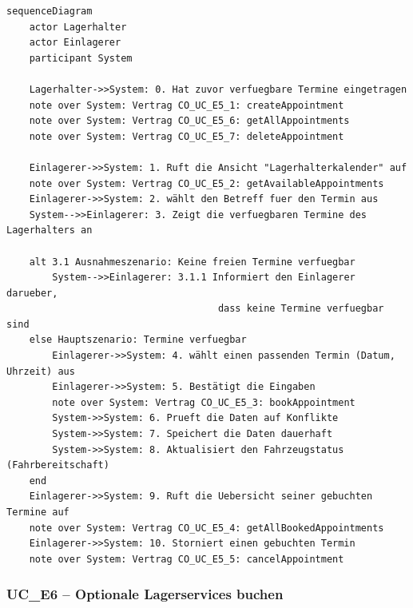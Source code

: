\begin{lstlisting}[basicstyle=\ttfamily\small, breaklines=true]
sequenceDiagram
    actor Lagerhalter
    actor Einlagerer
    participant System

    Lagerhalter->>System: 0. Hat zuvor verfuegbare Termine eingetragen
    note over System: Vertrag CO_UC_E5_1: createAppointment
    note over System: Vertrag CO_UC_E5_6: getAllAppointments
    note over System: Vertrag CO_UC_E5_7: deleteAppointment

    Einlagerer->>System: 1. Ruft die Ansicht "Lagerhalterkalender" auf
    note over System: Vertrag CO_UC_E5_2: getAvailableAppointments
    Einlagerer->>System: 2. wählt den Betreff fuer den Termin aus
    System-->>Einlagerer: 3. Zeigt die verfuegbaren Termine des Lagerhalters an

    alt 3.1 Ausnahmeszenario: Keine freien Termine verfuegbar
        System-->>Einlagerer: 3.1.1 Informiert den Einlagerer darueber,
                                     dass keine Termine verfuegbar sind
    else Hauptszenario: Termine verfuegbar
        Einlagerer->>System: 4. wählt einen passenden Termin (Datum, Uhrzeit) aus
        Einlagerer->>System: 5. Bestätigt die Eingaben
        note over System: Vertrag CO_UC_E5_3: bookAppointment
        System->>System: 6. Prueft die Daten auf Konflikte
        System->>System: 7. Speichert die Daten dauerhaft
        System->>System: 8. Aktualisiert den Fahrzeugstatus (Fahrbereitschaft)
    end
    Einlagerer->>System: 9. Ruft die Uebersicht seiner gebuchten Termine auf
    note over System: Vertrag CO_UC_E5_4: getAllBookedAppointments
    Einlagerer->>System: 10. Storniert einen gebuchten Termin
    note over System: Vertrag CO_UC_E5_5: cancelAppointment
\end{lstlisting}

\newpage

{}
\subsubsection*{UC\_E6 – Optionale Lagerservices buchen}

